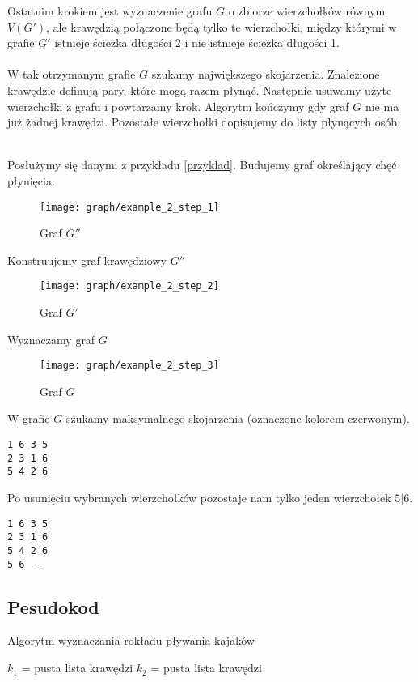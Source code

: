 \documentclass{llncs}
\begin{document}
Ostatnim krokiem jest wyznaczenie grafu $G$
o zbiorze wierzchołków równym $V(G')$, ale krawędzią
połączone będą tylko te wierzchołki, między którymi w grafie $G'$
istnieje ścieżka długości 2 i nie istnieje ścieżka długości 1.
\\\\
W tak otrzymanym grafie $G$ szukamy największego 
skojarzenia. Znalezione krawędzie definują
pary, które mogą razem płynąć. Następnie usuwamy użyte
wierzchołki z grafu i powtarzamy krok.
Algorytm kończymy gdy graf $G$ nie ma już żadnej krawędzi.
Pozostałe wierzchołki dopisujemy do listy płynących
osób.
\begin{example}~\\
Posłużymy się danymi z przykładu \ref{przyklad}.
Budujemy graf określający chęć płynięcia.
\begin{figure}[H]
  \caption{Graf $G''$}
  \centering
	\texttt{[image: graph/example\_2\_step\_1]}
\end{figure}
Konstruujemy graf krawędziowy $G''$
\begin{figure}[H]
  \caption{Graf $G'$}
  \centering
	\texttt{[image: graph/example\_2\_step\_2]}
\end{figure}
Wyznaczamy graf $G$
\begin{figure}[H]
  \caption{Graf $G$}
  \centering
	\texttt{[image: graph/example\_2\_step\_3]}
\end{figure}

W grafie $G$ szukamy maksymalnego skojarzenia (oznaczone kolorem czerwonym).
\begin{lstlisting}[title=Maksymalne skojarzenie]
1 6	3 5
2 3	1 6
5 4	2 6
\end{lstlisting}
Po usunięciu wybranych wierzchołków pozostaje nam tylko jeden 
wierzchołek $5|6$.
\begin{lstlisting}[title=Możliwy rozkład pływania]
1 6	3 5
2 3	1 6
5 4	2 6
5 6	 -
\end{lstlisting}

\end{example}

\subsection{Pesudokod}
\begin{algorithm}[H]
 \caption{Algorytm wyznaczania rokładu pływania kajaków}
 $k_1$ = pusta lista krawędzi\;
 $k_2$ = pusta lista krawędzi\;
\end{algorithm}
\end{document}
